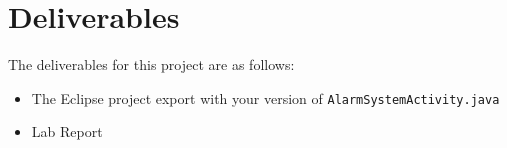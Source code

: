 \section{Deliverables}

The deliverables for this project are as follows:
\begin{itemize}
\item The Eclipse project export with your version of \verb=AlarmSystemActivity.java= 
\item Lab Report
\end {itemize}